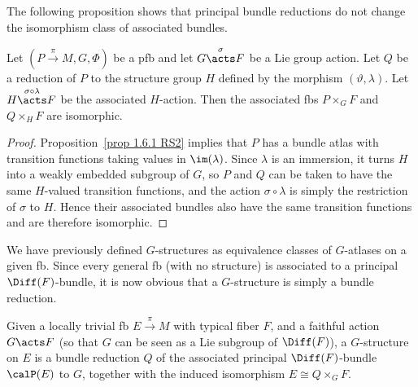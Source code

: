 The following proposition shows that principal bundle reductions do not change the isomorphism class of associated bundles.

\begin{prop}[{{\cite[Prop.~1.6.7]{RS2}}}]\label{prop 1.6.7 RS2}
    Let $(P\overset{\pi}{\to}M, G,\Phi)$ be a \gls{pfb} and let $G\overset{\sigma}{\acts}F$ be a Lie group action. Let $Q$ be a reduction of $P$ to the structure group $H$ defined by the morphism $(\vartheta,\lambda)$. Let $H\overset{\sigma\circ\lambda}{\acts}F$ be the associated $H$-action. Then the associated \glspl{fb} $P\times_G F$ and $Q\times_H F$ are isomorphic.
\end{prop}
\begin{proof}
    Proposition~\ref{prop 1.6.1 RS2} implies that $P$ has a bundle atlas with transition functions taking values in $\im(\lambda)$. Since $\lambda$ is an immersion, it turns $H$ into a weakly embedded subgroup of $G$, so $P$ and $Q$ can be taken to have the same $H$-valued transition functions, and the action $\sigma\circ\lambda$ is simply the restriction of $\sigma$ to $H$. Hence their associated bundles also have the same transition functions and are therefore isomorphic.
\end{proof}

We have previously defined $G$-structures as equivalence classes of $G$-atlases on a given \gls{fb}. Since every general \gls{fb} (with no structure) is associated to a principal $\Diff(F)$-bundle, it is now obvious that a $G$-structure is simply a bundle reduction.

\begin{defn}[$G$-structure]
    Given a locally trivial \gls{fb} $E\overset{\pi}{\to}M$ with typical fiber $F$, and a faithful action $G\acts F$ (so that $G$ can be seen as a Lie subgroup of $\Diff(F)$), a $G$-structure on $E$ is a bundle reduction $Q$ of the associated principal $\Diff(F)$-bundle $\calP(E)$ to $G$, together with the induced isomorphism $E\cong Q\times_G F$.
\end{defn}


